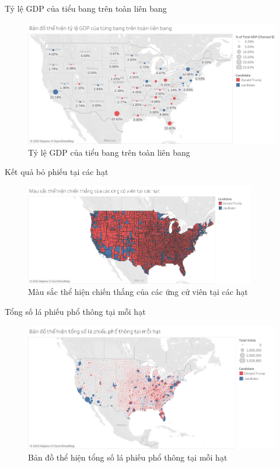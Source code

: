 \documentclass[10pt]{beamer}
\theoremstyle{remark}
\theoremstyle{definition}
\begin{document}
\begin{frame}{Tỷ lệ GDP của tiểu bang trên toàn liên bang}
	\begin{figure}[h!]
        \centering
        \includegraphics[width=\textwidth]{figures/State_Percentage_GDP_Circle.png}
        \caption{Tỷ lệ GDP của tiểu bang trên toàn liên bang}
    \end{figure}
\end{frame}

\begin{frame}{Kết quả bỏ phiếu tại các hạt}
	\begin{figure}[h!]
        \centering
        \includegraphics[width=0.9\textwidth]{County_Candidate_Win.png}
        \caption{Màu sắc thể hiện chiến thắng của các ứng cử viên tại các hạt}
    \end{figure}
\end{frame}

\begin{frame}{Tổng số lá phiếu phổ thông tại mỗi hạt}
	\begin{figure}[h!]
        \centering
        \includegraphics[width=\textwidth]{County_Total_Vote_Circle.png}
        \caption{Bản đồ thể hiện tổng số lá phiếu phổ thông tại mỗi hạt}
    \end{figure}
\end{frame}
\end{document}
